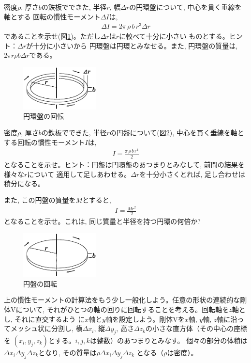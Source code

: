 %
\begin{q}\label{q:mominert_ringplate}
密度$\rho$, 厚さ$b$の鉄板でできた, 半径$r$, 幅$\Delta r$の円環盤について, 中心を貫く垂線を軸とする
回転の慣性モーメント$\Delta I$は, 
\begin{eqnarray}
\Delta I=2\pi\,\rho\,b\,r^3 \Delta r\label{eq:mominert_ringplate}
\end{eqnarray}
であることを示せ(図\ref{fig:disk4})。ただし$\Delta r$は$r$に較べて十分に小さい
ものとする。ヒント：$\Delta r$が十分に小さいから
円環盤は円環とみなせる。また, 円環盤の質量は, $2\pi r \rho b\Delta r$である。
\begin{figure}[h]
    \centering
    \includegraphics[width=4cm]{disk4.eps}
    \caption{円環盤の回転}\label{fig:disk4}
\end{figure}
\end{q}

%
\begin{q}\label{q:mominert_plate}
密度$\rho$, 厚さ$b$の鉄板でできた, 半径$r$の円盤について(図\ref{fig:disk5}), 
中心を貫く垂線を軸とする回転の慣性モーメント$I$は, 
\begin{eqnarray}
I=\frac{\pi\,\rho\,b\,r^4}{2}\label{eq:mominert_disk}
\end{eqnarray}
となることを示せ。ヒント：円盤は円環盤のあつまりとみなして, 前問の結果を様々な$r$について
適用して足しあわせる。$\Delta r$を十分小さくとれば, 足し合わせは積分になる。

また, この円盤の質量を$M$とすると, 
\begin{eqnarray}
I=\frac{Mr^2}{2}\label{eq:mominert_disc_horizon}
\end{eqnarray}
となることを示せ。これは, 同じ質量と半径を持つ円環の何倍か?
\begin{figure}[h]
    \centering
    \includegraphics[width=4cm]{disk5.eps}
    \caption{円盤の回転}\label{fig:disk5}
\end{figure}
\end{q}

上の慣性モーメントの計算法をもう少し一般化しよう。任意の形状の連続的な剛体Vについて, 
それがひとつの軸の回りに回転することを考える。回転軸を$z$軸とし, それに直交するよう
に$x$軸と$y$軸を設定しよう。剛体Vを$x$軸, $y$軸, $z$軸に沿ってメッシュ状に分割し, 
横$\Delta x_i$, 縦$\Delta y_j$, 高さ$\Delta z_k$の小さな直方体（その中心の座標を
$(x_i, y_j, z_k)$とする。$i, j, k$は整数）のあつまりとみなす。
個々の部分の体積は$\Delta x_i \Delta y_j \Delta z_k$となり, その質量は$\rho \Delta x_i \Delta y_j \Delta z_k$
となる（$\rho$は密度）。


